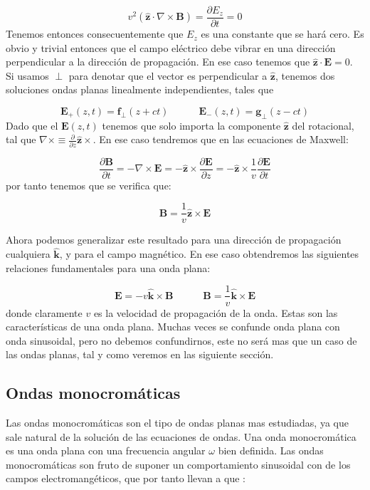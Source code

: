 \documentclass[12pt,a4paper]{article}
\newcommand{\parciales}[2]{\frac{\partial #1}{\partial #2}}
\newcommand{\tquad}{\quad \quad \quad}
\newcommand{\rota}{\nabla \times}
\newcommand{\Bn}{\mathbf{B}}
\newcommand{\En}{\mathbf{E}}
\newcommand{\fn}{\mathbf{f}}
\newcommand{\gn}{\mathbf{g}}
\newcommand{\hnz}{\hat{\mathbf{z}}}
\newcommand{\hnk}{\hat{\mathbf{k}}}
\numberwithin{equation}{section}
\numberwithin{figure}{section}
\begin{document}
\begin{equation}
v^2 ( \hnz \cdot \rota \Bn ) = \parciales{E_z}{t} = 0 
\end{equation}
Tenemos entonces consecuentemente que $E_z$ es una constante que se hará cero. Es obvio y trivial entonces que el campo eléctrico debe vibrar en una dirección perpendicular a la dirección de propagación. En ese caso tenemos que $\hnz \cdot \En = 0$. Si usamos $\perp$ para denotar que el vector es perpendicular a $\hnz$, tenemos dos soluciones ondas planas linealmente independientes, tales que

\begin{equation}
\En_+ (z,t) = \fn_\perp (z+ct) \tquad \En_- (z,t) = \gn_\perp (z-ct)
\end{equation}
Dado que el $\En(z,t)$ tenemos que solo importa la componente $\hnz$ del rotacional, tal que $\rota \equiv \parciales{}{z} \hnz \times$. En ese caso tendremos que en las ecuaciones de Maxwell:

\begin{equation}
\parciales{\Bn}{t} = - \rota \En = - \hnz \times \parciales{\En}{z} = - \hnz \times \dfrac{1}{v} \parciales{\En}{t}
\end{equation}
por tanto tenemos que se verifica que:

\begin{equation}
\Bn = \dfrac{1}{v} \hnz \times \En
\end{equation}

Ahora podemos generalizar este resultado para una dirección de propagación cualquiera $\hnk$, y para el campo magnético. En ese caso obtendremos las siguientes relaciones fundamentales para una onda plana:

\begin{equation}
\En = - v \hnk \times  \Bn     \tquad \Bn = \dfrac{1}{v} \hnk \times \En
\end{equation}
donde claramente $v$ es la velocidad de propagación de la onda. Estas son las características de una onda plana. Muchas veces se confunde onda plana con onda sinusoidal, pero no debemos confundirnos, este no será mas que un caso de las ondas planas, tal y como veremos en las siguiente sección. 

\subsection{Ondas monocromáticas}

Las ondas monocromáticas son el tipo de ondas planas mas estudiadas, ya que sale natural de la solución de las ecuaciones de ondas. Una onda monocromática es una onda plana con una frecuencia angular $\omega$ bien definida. Las ondas monocromáticas son fruto de suponer un comportamiento sinusoidal con de los campos electromangéticos, que por tanto llevan a que :
\end{document}
